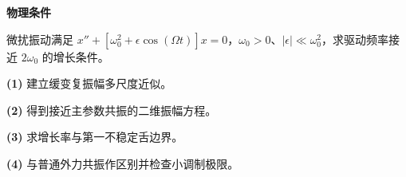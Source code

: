 \textbf{物理条件}\par 微扰振动满足 \(x''+[\omega_0^2+\epsilon\cos(\Omega t)]x=0\)，\(\omega_0>0\)、\(|\epsilon|\ll\omega_0^2\)，求驱动频率接近 \(2\omega_0\) 的增长条件。
\par\noindent\textbf{(1)} 建立缓变复振幅多尺度近似。
\par\noindent\textbf{(2)} 得到接近主参数共振的二维振幅方程。
\par\noindent\textbf{(3)} 求增长率与第一不稳定舌边界。
\par\noindent\textbf{(4)} 与普通外力共振作区别并检查小调制极限。
